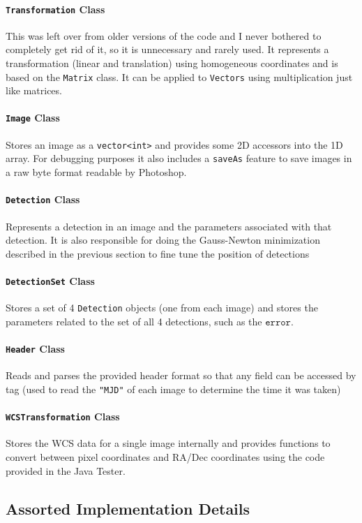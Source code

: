 \documentclass[letterpaper,options]{article}
\begin{document}
\paragraph{\texttt{Transformation} Class}
This was left over from older versions of the code and I never bothered to completely get rid of it, so it is unnecessary and rarely used. It represents a transformation (linear and translation) using homogeneous coordinates and is based on the \texttt{Matrix} class. It can be applied to \texttt{Vectors} using multiplication just like matrices.
\paragraph{\texttt{Image} Class}
Stores an image as a \texttt{vector<int>} and provides some 2D accessors into the 1D array. For debugging purposes it also includes a \texttt{saveAs} feature to save images in a raw byte format readable by Photoshop.
\paragraph{\texttt{Detection} Class}
Represents a detection in an image and the parameters associated with that detection. It is also responsible for doing the Gauss-Newton minimization described in the previous section to fine tune the position of detections
\paragraph{\texttt{DetectionSet} Class}
Stores a set of 4 \texttt{Detection} objects (one from each image) and stores the parameters related to the set of all 4 detections, such as the $\texttt{error}$.
\paragraph{\texttt{Header} Class}
Reads and parses the provided header format so that any field can be accessed by tag (used to read the \texttt{"MJD"} of each image to determine the time it was taken)
\paragraph{\texttt{WCSTransformation} Class} Stores the WCS data for a single image internally and provides functions to convert between pixel coordinates and RA/Dec coordinates using the code provided in the Java Tester.
\subsection{Assorted Implementation Details}
\end{document}
